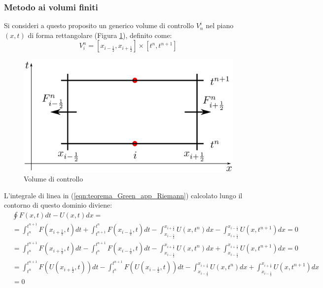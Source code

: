 \documentclass[12pt]{article} %
\begin{document}
\subsubsection{Metodo ai volumi finiti}
\noindent Si consideri a questo proposito un generico volume di controllo $V^{i}_n$ nel piano $(x,t)$ di forma rettangolare (Figura \ref{fig:Volume di controllo}), definito come: 
\begin{equation}
    V^{n}_i=[x_{i-\frac{1}{2}},x_{i+\frac{1}{2}}]\times[t^n,t^{n+1}]
    \label{eqn:volume_di_controllo}
\end{equation}
\begin{figure} [H]
    \centering
    \includegraphics[width=0.5\columnwidth]{Volume di Controllo.png}
    \caption{Volume di controllo}
    \label{fig:Volume di controllo}
\end{figure}
\noindent L'integrale di linea in (\ref{eqn:teorema_Green_app_Riemann}) calcolato lungo il contorno di questo dominio diviene:
\begin{equation}
    \begin{split}
    &\oint F(x,t)dt - U(x,t)dx = \\ &=\int_{t^n}^{t^{n+1}}F\left(x_{i+\frac{1}{2}},t\right)dt+\int_{t^{n+1}}^{t^n}F\left(x_{i-\frac{1}{2}},t\right)dt-\int_{x_{i-\frac{1}{2}}}^{x_{i+\frac{1}{2}}}U\left(x,t^n\right)dx-\int_{x_{i+\frac{1}{2}}}^{x_{i-\frac{1}{2}}}U\left(x,t^{n+1}\right)dx=0 \\
    &=\int_{t^n}^{t^{n+1}}F\left(x_{i+\frac{1}{2}},t\right)dt-\int_{t^n}^{t^{n+1}}F\left(x_{i-\frac{1}{2}},t\right)dt-\int_{x_{i-\frac{1}{2}}}^{x_{i+\frac{1}{2}}}U\left(x,t^n\right)dx+\int_{x_{i-\frac{1}{2}}}^{x_{i+\frac{1}{2}}}U\left(x,t^{n+1}\right)dx=0 \\
    &=\int_{t^n}^{t^{n+1}}F\left(U\left(x_{i+\frac{1}{2}},t\right)\right)dt-\int_{t^n}^{t^{n+1}}F\left(U\left(x_{i-\frac{1}{2}},t\right)\right)dt-\int_{x_{i-\frac{1}{2}}}^{x_{i+\frac{1}{2}}}U\left(x,t^n\right)dx+\int_{x_{i-\frac{1}{2}}}^{x_{i+\frac{1}{2}}}U\left(x,t^{n+1}\right)dx \\ &=0
    \label{eqn:integrale_linea}
    \end{split}
\end{equation}
\end{document}
